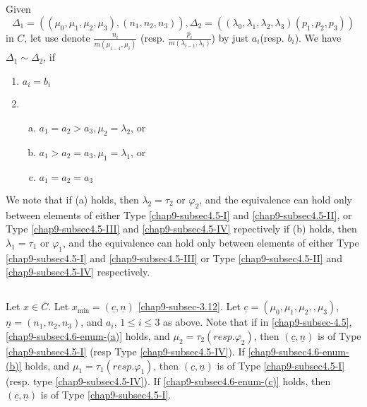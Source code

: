\subsection{}\label{chap9-subsec-4.6}
Given\pageoriginale
$$
\Delta_{1} = ((\mu_{0},\mu_{1}, \mu_{2}, \mu_{3}),(n_{1},n_{2}, n_{3})), \Delta_{2} = ((\lambda_{0}, \lambda_{1}, \lambda_{2}, \lambda_{3})(p_{1}, p_{2}, p_{3}))
$$
in $C$, let use denote $\frac{n_{i}}{m(\mu_{i-1}, \mu_{i})}$ (resp. $\frac{p_{i}}{m(\lambda_{i-1}, \lambda_{i})}$) by just $a_{i}$(resp. $b_{i}$).  We have $\Delta_{1} \sim \Delta_{2}$, if
\begin{enumerate}[(1)]
\item $a_{i} =b_{i}$
\item

 \begin{enumerate}[(a)]
    \item $a_{1} = a_{2} > a_{3}, \mu_{2} =\lambda_{2}$, or\label{chap9-subsec4.6-enum-(a)}
    \item $a_{1} > a_{2} = a_{3}, \mu_{1} =\lambda_{1}$, or\label{chap9-subsec4.6-enum-(b)}
    \item $a_{1} = a_{2} = a_{3}$\label{chap9-subsec4.6-enum-(c)}
 \end{enumerate}
\end{enumerate}
We note that if (a) holds, then $\lambda_{2}=\tau_{2}$ or $\varphi_{2}$, and the equivalence can hold only between elements of either Type \ref{chap9-subsec4.5-I} and \ref{chap9-subsec4.5-II}, or Type \ref{chap9-subsec4.5-III} and
\ref{chap9-subsec4.5-IV} repectively if (b) holds, then $\lambda_{1}= \tau_{1}$ or $\varphi_{1}$, and the equivalence can  hold only between elements of either Type  \ref{chap9-subsec4.5-I} and \ref{chap9-subsec4.5-III} or
Type \ref{chap9-subsec4.5-II} and \ref{chap9-subsec4.5-IV} respectively.

\subsection{}\label{chap9-subsec-4.7}
Let $x \in \overline{C}$. Let $ x_{\min} = (\underline{c}, \underline{n})$ \eqref{chap9-subsec-3.12}. Let $\underline{c} = (\mu_{0}, \mu_{1}, \mu_{2},,\mu_{3})$, $\underline{n} = (n_{1}, n_{2}, n_{3})$, and $a_{i}$, $1 \leq i \leq 3$ as above. Note that if in \ref{chap9-subsec-4.5}, \ref{chap9-subsec4.6-enum-(a)} holds, and $\mu_{2} = \tau_{2}(resp.\varphi_{2})$, then $(\underline{c}, \underline{n})$ is of Type \ref{chap9-subsec4.5-I} (resp Type \ref{chap9-subsec4.5-IV}). If \ref{chap9-subsec4.6-enum-(b)} holds, and $\mu_{1} = \tau_{1}(resp.\varphi_{1})$, then $(\underline{c}, \underline{n})$ is of Type \ref{chap9-subsec4.5-I} (resp. type \ref{chap9-subsec4.5-IV}). If \ref{chap9-subsec4.6-enum-(c)} holds, then $(\underline{c}, \underline{n})$ is of Type \ref{chap9-subsec4.5-I}. 

